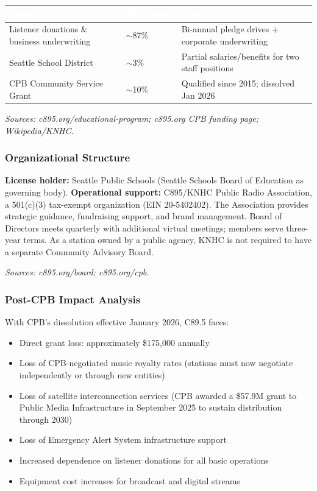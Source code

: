 \documentclass[11pt,letterpaper]{article}
\newcommand{\tableheader}[1]{\textbf{\sffamily\textcolor{white}{#1}}}
\begin{document}
\begin{center}
\begin{tabularx}{\textwidth}{XC{2.5cm}X}
\toprule
{}
\tableheader{Source} & \tableheader{Percentage} & \tableheader{Notes} \\
\midrule
Listener donations \& business underwriting & $\sim$87\% & Bi-annual pledge drives + corporate underwriting \\
Seattle School District & $\sim$3\% & Partial salaries/benefits for two staff positions \\
CPB Community Service Grant & $\sim$10\% & Qualified since 2015; dissolved Jan 2026 \\
\bottomrule
\end{tabularx}
\end{center}

\textit{Sources: c895.org/educational-program; c895.org CPB funding page; Wikipedia/KNHC.}

\subsubsection{Organizational Structure}

\textbf{License holder:} Seattle Public Schools (Seattle Schools Board of Education as governing body). \textbf{Operational support:} C895/KNHC Public Radio Association, a 501(c)(3) tax-exempt organization (EIN 20-5402402). The Association provides strategic guidance, fundraising support, and brand management. Board of Directors meets quarterly with additional virtual meetings; members serve three-year terms. As a station owned by a public agency, KNHC is not required to have a separate Community Advisory Board.

\textit{Sources: c895.org/board; c895.org/cpb.}

\subsubsection{Post-CPB Impact Analysis}

With CPB's dissolution effective January 2026, C89.5 faces:
\begin{itemize}[leftmargin=2em]
\item Direct grant loss: approximately \$175,000 annually
\item Loss of CPB-negotiated music royalty rates (stations must now negotiate independently or through new entities)
\item Loss of satellite interconnection services (CPB awarded a \$57.9M grant to Public Media Infrastructure in September 2025 to sustain distribution through 2030)
\item Loss of Emergency Alert System infrastructure support
\item Increased dependence on listener donations for all basic operations
\item Equipment cost increases for broadcast and digital streams
\end{itemize}
\end{document}
